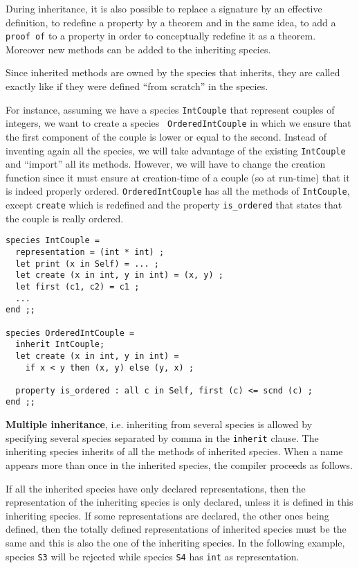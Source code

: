 During inheritance, it is also possible to replace a signature by an
effective definition, to redefine a property by a theorem and in the
same idea, to add a {\tt proof of} to a property in order to
conceptually redefine it as a theorem. Moreover new methods can be
added to the inheriting species.

Since inherited methods are owned by the species that inherits, they are
called exactly like if they were defined ``from scratch'' in the species.

For instance, assuming we have a species {\tt IntCouple} that
represent couples of integers, we want to create a species {\tt
OrderedIntCouple} in which we ensure that the first component of the
couple is lower or equal to the second. Instead of inventing again all
the species, we will take advantage of the existing {\tt IntCouple}
and ``import'' all its methods. However, we will have to change the
creation function since it must ensure at creation-time of a couple
(so at run-time) that it is indeed properly ordered.
{\tt OrderedIntCouple} has all the methods of {\tt IntCouple}, except
{\tt create} which is redefined and the property {\tt is\_ordered} that
states that the couple is really ordered.

{\scriptsize
\begin{lstlisting}
species IntCouple =
  representation = (int * int) ;
  let print (x in Self) = ... ;
  let create (x in int, y in int) = (x, y) ;
  let first (c1, c2) = c1 ;
  ...
end ;;

species OrderedIntCouple =
  inherit IntCouple;
  let create (x in int, y in int) =
    if x < y then (x, y) else (y, x) ;

  property is_ordered : all c in Self, first (c) <= scnd (c) ;
end ;;
\end{lstlisting}}




\smallskip
{}
{\bf Multiple inheritance}, i.e. inheriting from several species is
allowed by specifying several species separated by comma in the
{\tt inherit} clause. The inheriting species inherits of all the
methods of inherited species. When a name appears more than once
in the inherited species, the compiler proceeds as follows.

If all the inherited species have only declared representations, then
the representation of the inheriting species is only declared, unless
it is defined in this inheriting species. If some representations are
declared, the other ones being defined, then the totally defined
representations of inherited species must be the same and this is also
the one of the inheriting species. In the following example, species
{\tt S3} will be rejected while species {\tt S4} has {\tt int} as
representation.

